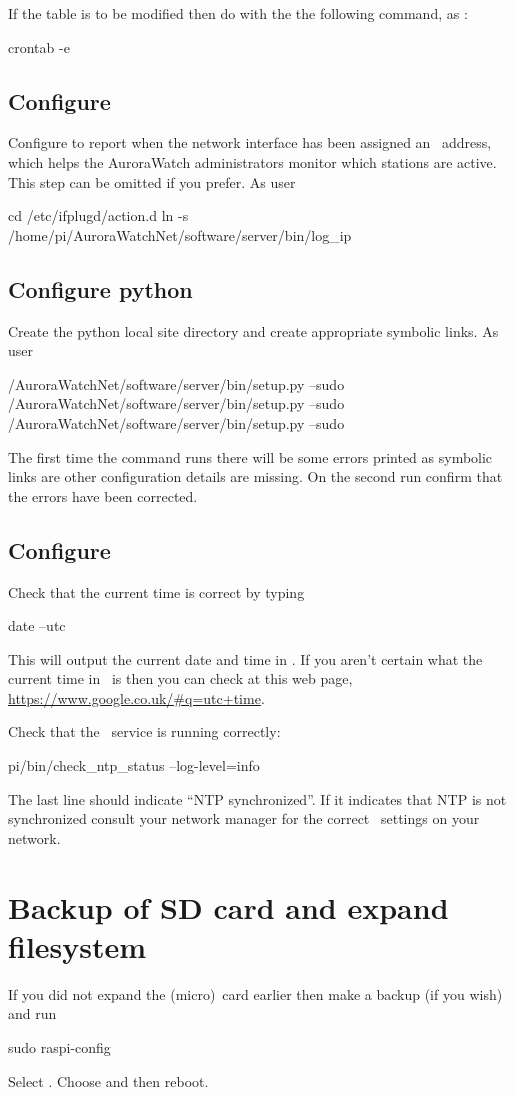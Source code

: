 If the  table is to be modified then do with the the
following command, as \piUser:

\begin{Cmd}
crontab -e  
\end{Cmd}


\subsection{Configure \protect{}}

Configure  to report when the network interface has
been assigned an \ip\ address, which helps the AuroraWatch
administrators monitor which stations are active. This step can be
omitted if you prefer. As user \rootUser
\begin{Cmd}
cd /etc/ifplugd/action.d
ln -s /home/pi/AuroraWatchNet/software/server/bin/log_ip
\end{Cmd}

\subsection{Configure python}

Create the python local site directory and create appropriate symbolic
links. As user \piUser
\begin{Cmd}
\mytilde/AuroraWatchNet/software/server/bin/setup.py --sudo
\mytilde/AuroraWatchNet/software/server/bin/setup.py --sudo
\mytilde/AuroraWatchNet/software/server/bin/setup.py --sudo
\end{Cmd}

The first time the command runs there will be some errors printed as
symbolic links are other configuration details are missing. On the
second run confirm that the errors have been corrected.


\subsection{Configure \protect{}}
Check that the current time is correct by typing
\begin{Cmd}
date --utc
\end{Cmd}
This will output the current date and time in \utc. If you aren't
certain what the current time in \utc\ is then you can check at this
web page, \url{https://www.google.co.uk/#q=utc+time}.

Check that the \ntp\ service is running correctly:
\begin{Cmd}
\mytilde{}pi/bin/check_ntp_status --log-level=info
\end{Cmd}
The last line should indicate ``NTP synchronized''. If it indicates
that NTP is not synchronized consult your network manager for the
correct \ntp\ settings on your network.



\section{Backup of SD card and expand filesystem}

If you did not expand the (micro)\sd\ card earlier then make a backup
(if you wish) and run
\begin{Cmd}
sudo raspi-config
\end{Cmd}
Select . Choose  and then reboot.
